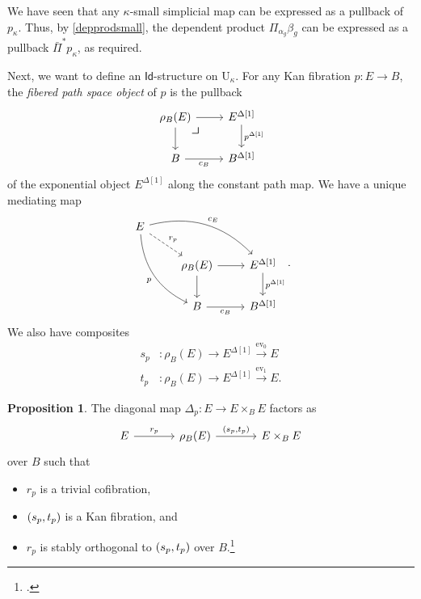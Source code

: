 \documentclass[10pt,letterpaper,cm]{nupset}
\theoremstyle{definition}
\theoremstyle{theorem}
\newtheorem{prop}[definition]{Proposition}
\theoremstyle{remark}
\DeclareMathOperator{\ev}{ev}
\newcommand{\id}{\mathsf{Id}}
\newcommand{\0}{\mathbf{0}}
\newcommand{\1}{\mathbf{1}}
\newcommand{\2}{\mathbf{2}}
\newcommand{\bi}{\begin{itemize}}
\newcommand{\ei}{\end{itemize}}
\begin{document}
We have seen that any $\kappa$-small simplicial map can be expressed as a pullback of $p_{\kappa}$. Thus, by \cref{depprodsmall}, the dependent product $\Pi_{\alpha_g}\beta_g$ can be expressed as a pullback $\bar{\Pi}^{\ast}{p_{\kappa}}$, as required.

\bigskip

Next, we want to define an $\id$-structure on $\mathrm{U}_{\kappa}$. For any Kan fibration $p:E \to B$, the \textit{fibered path space object} of $p$ is the pullback
\[
\begin{tikzcd}
\rho_B(E) \arrow[d] \arrow[r] 
\arrow[dr, phantom, "\scalebox{1.5}{\color{black}$\lrcorner$}" , very near start, color=black]
& 
{E^{\Delta[1]}} \arrow[d, "{p^{\Delta[1]}}"] \\
B \arrow[r, "c_B"']             & {B^{\Delta[1]}}                             
\end{tikzcd}
\] of the exponential object $E^{\Delta[1]}$ along the constant path map. We have a unique mediating map
\[
\begin{tikzcd}
E \arrow[rdd, "p"', bend right] \arrow[rrd, "c_E", bend left] \arrow[rd, "r_p", dashed]  &                               &                                              \\
                                                                                        & \rho_B(E) \arrow[d] \arrow[r] & {E^{\Delta[1]}} \arrow[d, "{p^{\Delta[1]}}"] \\
                                                                                        & B \arrow[r, "c_B"']           & {B^{\Delta[1]}}                             
\end{tikzcd}.
\] We also have composites 
\begin{align*}
s_p &: \rho_B(E) \to E^{\Delta[1]} \xrightarrow{\ev_0} E
\\ t_p &: \rho_B(E) \to E^{\Delta[1]} \xrightarrow{\ev_1} E.
\end{align*}

\begin{prop}\label{fibpathspace}
The diagonal map $\Delta_p : E \to E\times_B E$ factors as
\[
\begin{tikzcd}[column sep=large]
E \arrow[r, "r_p"] & \rho_B(E) \arrow[r, "{\mleft(s_p,t_p\mright)}"] & E\times_BE
\end{tikzcd}
\] over $B$ such that
\bi
\item $r_p$ is a trivial cofibration, 
\item $\mleft(s_p,t_p\mright)$ is a Kan fibration, and
\item $r_p$ is stably orthogonal to $\mleft(s_p,t_p\mright)$ over $B$.\footnote{\autocite[Proposition 2.3.3]{KL}.}
\ei
\end{prop}
\end{document}
